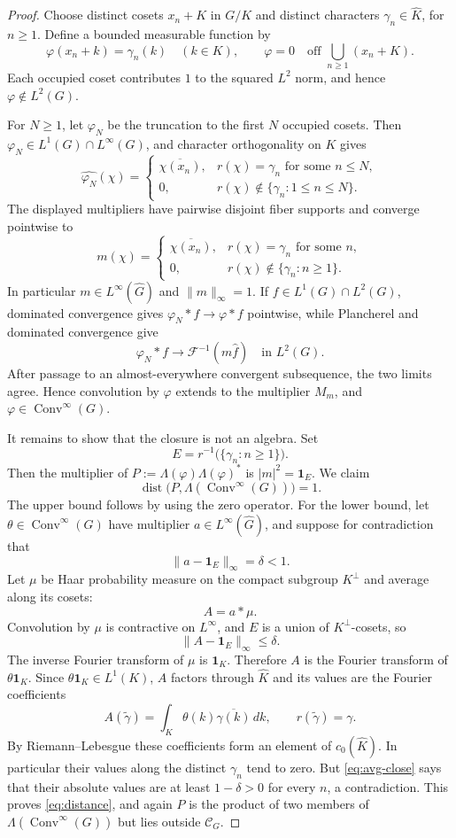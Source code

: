 \documentclass[11pt]{article}
\newcommand{\Conv}{\operatorname{Conv}^{\infty}}
\newcommand{\F}{\mathcal F}
\newcommand{\one}{\mathbf 1}
\begin{document}
\begin{proof}
Choose distinct cosets $x_n+K$ in $G/K$ and distinct characters
$\gamma_n\in\widehat K$, for $n\geq1$.  Define a bounded measurable function
by
\[
 \varphi(x_n+k)=\gamma_n(k)\quad(k\in K),
 \qquad
 \varphi=0\quad\text{off }\bigcup_{n\geq1}(x_n+K).
\]
Each occupied coset contributes $1$ to the squared $L^2$ norm, and hence
$\varphi\notin L^2(G)$.

For $N\geq1$, let $\varphi_N$ be the truncation to the first $N$ occupied
cosets.  Then $\varphi_N\in L^1(G)\cap L^\infty(G)$, and character
orthogonality on $K$ gives
\[
 \widehat{\varphi_N}(\chi)=
 \begin{cases}
   \overline{\chi(x_n)},&r(\chi)=\gamma_n\text{ for some }n\leq N,\\
   0,&r(\chi)\notin\{\gamma_n:1\leq n\leq N\}.
 \end{cases}
\]
The displayed multipliers have pairwise disjoint fiber supports and converge
pointwise to
\[
 m(\chi)=
 \begin{cases}
   \overline{\chi(x_n)},&r(\chi)=\gamma_n\text{ for some }n,\\
   0,&r(\chi)\notin\{\gamma_n:n\geq1\}.
 \end{cases}\label{eq:multiplier}
\]
In particular $m\in L^\infty(\widehat G)$ and $\|m\|_\infty=1$.  If
$f\in L^1(G)\cap L^2(G)$, dominated convergence gives
$\varphi_N*f\to\varphi*f$ pointwise, while Plancherel and dominated
convergence give
\[
 \varphi_N*f\longrightarrow\F^{-1}(m\widehat f)
 \quad\text{in }L^2(G).
\]
After passage to an almost-everywhere convergent subsequence, the two limits
agree.  Hence convolution by $\varphi$ extends to the multiplier $M_m$, and
$\varphi\in\Conv(G)$.

It remains to show that the closure is not an algebra.  Set
\[
 E=r^{-1}\bigl(\{\gamma_n:n\geq1\}\bigr).
\]
Then the multiplier of
$P:=\Lambda(\varphi)\Lambda(\varphi)^*$ is $|m|^2=\one_E$.
We claim
\[
 \operatorname{dist}\bigl(P,\Lambda(\Conv(G))\bigr)=1.\label{eq:distance}
\]
The upper bound follows by using the zero operator.  For the lower bound, let
$\theta\in\Conv(G)$ have multiplier $a\in L^\infty(\widehat G)$, and suppose
for contradiction that
\[
 \|a-\one_E\|_\infty=\delta<1.
\]
Let $\mu$ be Haar probability measure on the compact subgroup $K^\perp$ and
average along its cosets:
\[
 A=a*\mu.
\]
Convolution by $\mu$ is contractive on $L^\infty$, and $E$ is a union of
$K^\perp$-cosets, so
\[
 \|A-\one_E\|_\infty\leq\delta.\label{eq:avg-close}
\]
The inverse Fourier transform of $\mu$ is $\one_K$.  Therefore $A$ is the
Fourier transform of $\theta\one_K$.  Since
$\theta\one_K\in L^1(K)$, $A$ factors through $\widehat K$ and its values are
the Fourier coefficients
\[
 A(\widetilde\gamma)
 =\int_K\theta(k)\overline{\gamma(k)}\,dk,
 \qquad r(\widetilde\gamma)=\gamma.
\]
By Riemann--Lebesgue these coefficients form an element of
$c_0(\widehat K)$.  In particular their values along the distinct
$\gamma_n$ tend to zero.  But \eqref{eq:avg-close} says that their absolute
values are at least $1-\delta>0$ for every $n$, a contradiction.  This proves
\eqref{eq:distance}, and again $P$ is the product of two members of
$\Lambda(\Conv(G))$ but lies outside $\mathcal C_G$.


\end{proof}
\end{document}
